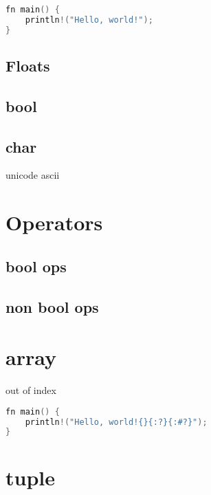 \documentclass{book}
\begin{document}
\begin{lstlisting}[language=C, caption=Definition variables]
fn main() {
    println!("Hello, world!");
}
\end{lstlisting}
\subsection{Floats}
\subsection{bool}
\subsection{char}
unicode
ascii
\section{Operators}
\subsection{bool ops}
\subsection{non bool ops}
\section{array}
out of index
\begin{lstlisting}[language=C, caption=Definition variables]
fn main() {
    println!("Hello, world!{}{:?}{:#?}");
}
\end{lstlisting}
\section{tuple}
\lstlistoflistings
\end{document}
